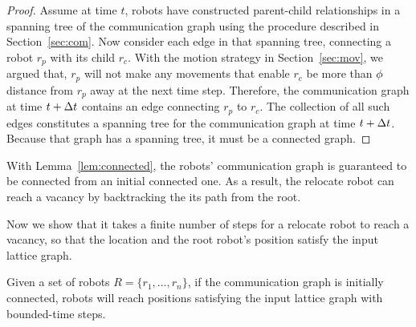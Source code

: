 \begin{proof}
    Assume at time $t$, robots have constructed parent-child relationships in a spanning tree of the communication graph using the procedure described in Section~\ref{sec:com}.
    Now consider each edge in that spanning tree, connecting a robot $r_p$ with its
    child $r_c$.
    With the motion strategy in Section~\ref{sec:mov}, we argued that,
    $r_p$ will not make any movements that enable $r_c$ be more than $\phi$
    distance from $r_p$ away at the next time step. 
    Therefore, the
    communication graph at time $t+\Delta t$ contains an edge connecting $r_p$ to
    $r_c$.
    The collection of all such edges constitutes a spanning tree for the
    communication graph at time $t+\Delta t$.  Because that graph has a spanning
    tree, it must be a connected graph.
\end{proof}

With Lemma~\ref{lem:connected}, the robots'
communication graph is guaranteed to be connected from an initial connected one.
%
As a result, the relocate robot can reach a vacancy by backtracking the its path from the root. 

Now we show that it takes a finite number of steps for a relocate robot to reach
a vacancy, so that the location and the root robot's position satisfy the
input lattice graph.

\begin{thm}
    Given a set of robots $R =\{r_1, \ldots, r_n\}$, if the
    communication graph is initially connected, robots will reach
    positions satisfying the input lattice graph with bounded-time steps.
\end{thm}

